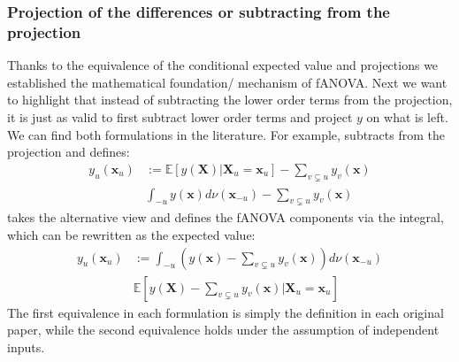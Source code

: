\subsubsection*{Projection of the differences or subtracting from the projection}
Thanks to the equivalence of the conditional expected value and projections we established the mathematical foundation/ mechanism of fANOVA.
Next we want to highlight that instead of subtracting the lower order terms from the projection, it is just as valid to first subtract lower order terms and project $y$ on what is left.
We can find both formulations in the literature.
For example, \cite{muehlenstaedt2012} subtracts from the projection and defines:
\begin{align*}
    y_u(\boldsymbol{x}_u) &:=
    \mathbb{E}[y(\boldsymbol{X}) | \boldsymbol{X}_{u} = \boldsymbol{x}_u] - \sum_{v \subsetneq u} y_v(\boldsymbol{x}) \\
    & \int_{-u} y(\boldsymbol{x}) d \nu(\boldsymbol{x}_{-u}) - \sum_{v \subsetneq u} y_v(\boldsymbol{x})
\end{align*}
\cite{hooker2004} takes the alternative view and defines the fANOVA components via the integral, which can be rewritten as the expected value:
\begin{align*}
    y_u(\boldsymbol{x}_u)
    &:= \int_{-u} (y(\boldsymbol{x}) - \sum_{v \subsetneq u} y_v(\boldsymbol{x})) d \nu(\boldsymbol{x}_{-u}) \\
    & \mathbb{E}[y(\boldsymbol{X}) - \sum_{v \subsetneq u} y_v(\boldsymbol{x}) | \boldsymbol{X}_{u} = \boldsymbol{x}_u ] 
\end{align*}
The first equivalence in each formulation is simply the definition in each original paper, while the second equivalence holds under the assumption of independent inputs.


